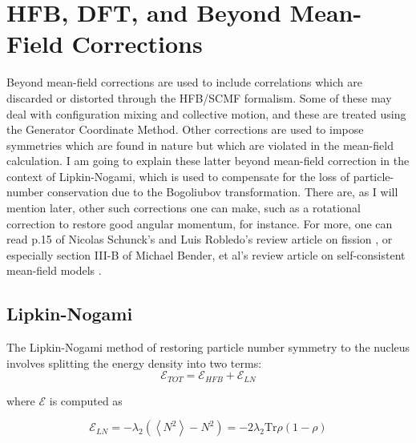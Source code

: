 \chapter{HFB, DFT, and Beyond Mean-Field Corrections}

\maketitle

Beyond mean-field corrections are used to include correlations which are discarded or distorted through the HFB/SCMF formalism. Some of these may deal with configuration mixing and collective motion, and these are treated using the Generator Coordinate Method. Other corrections are used to impose symmetries which are found in nature but which are violated in the mean-field calculation. I am going to explain these latter beyond mean-field correction in the context of Lipkin-Nogami, which is used to compensate for the loss of particle-number conservation due to the Bogoliubov transformation. There are, as I will mention later, other such corrections one can make, such as a rotational correction to restore good angular momentum, for instance. For more, one can read p.15 of Nicolas Schunck's and Luis Robledo's review article on fission \cite{Schunck2016review}, or especially section III-B of Michael Bender, et al's review article on self-consistent mean-field models \cite{Bender2003}.

\section*{Lipkin-Nogami}
The Lipkin-Nogami method of restoring particle number symmetry to the nucleus involves splitting the energy density into two terms:
\begin{equation*}
\mathcal{E}_{TOT} = \mathcal{E}_{HFB} + \mathcal{E}_{LN}
\end{equation*}

\noindent where $\mathcal{E}$ is computed as

\begin{equation*}
\mathcal{E}_{LN} = -\lambda_2\left(\left\langle N^2\right\rangle -N^2\right) = -2\lambda_2 \mathrm{Tr}\rho\left(1-\rho\right)
\end{equation*}

